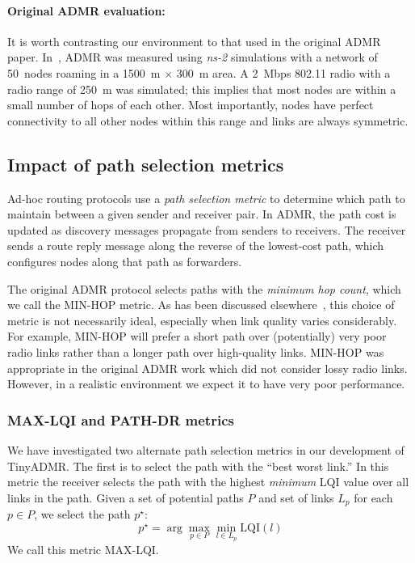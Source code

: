 \paragraph*{Original ADMR evaluation:} It is worth contrasting our
environment to that used in the original ADMR paper. 
In~\cite{admr}, ADMR was measured using {\em ns-2} simulations
with a network of 50~nodes roaming in a 1500~m $\times$ 300~m area. 
A 2~Mbps 802.11 radio with a radio range of 250~m was simulated; 
this implies that most nodes are within a small
number of hops of each other. Most importantly, nodes have perfect
connectivity to all other nodes within this range and links are
always symmetric.

\subsection{Impact of path selection metrics}
\label{sec-tinyadmr-routing-metric}

Ad-hoc routing protocols use a {\em path selection metric} to 
determine which path to maintain between a given sender and receiver
pair. In ADMR, the path cost is updated as discovery messages
propagate from senders to receivers. The receiver sends a 
route reply message along the reverse of the lowest-cost path,
which configures nodes along that path as forwarders.

The original ADMR protocol selects paths with the {\em minimum hop
count}, which we call the MIN-HOP metric.
As has been discussed elsewhere~\cite{etx,awoo-multihop},
this choice of metric is not necessarily ideal, especially when 
link quality varies considerably. For example, MIN-HOP will prefer 
a short path over (potentially) very poor radio links rather than
a longer path over high-quality links.  MIN-HOP was appropriate in the
original ADMR work which did not consider lossy radio links. However,
in a realistic environment we expect it to have very poor performance.

\subsubsection{MAX-LQI and PATH-DR metrics}

We have investigated two alternate path selection metrics in our
development of TinyADMR. 
The first is to select the path with the ``best worst link.''
In this metric the receiver selects the path with the highest 
{\em minimum} LQI value over all links in the path. Given a set 
of potential paths $P$ and set of links $L_p$ for each $p \in P$, 
we select the path $p^\star$:
\[
  p^\star = \arg \max_{p \in P} \min_{l \in L_p} \mathrm{LQI}(l)
\]
We call this metric MAX-LQI.

